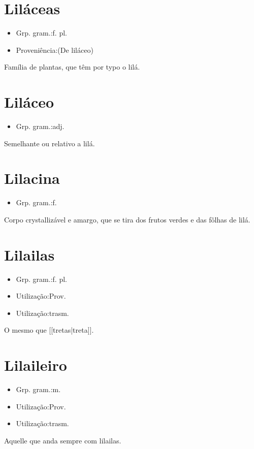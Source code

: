 \section{Liláceas}
\begin{itemize}
\item {Grp. gram.:f. pl.}
\end{itemize}
\begin{itemize}
\item {Proveniência:(De \textunderscore liláceo\textunderscore )}
\end{itemize}
Família de plantas, que têm por typo o lilá.
\section{Liláceo}
\begin{itemize}
\item {Grp. gram.:adj.}
\end{itemize}
Semelhante ou relativo a lilá.
\section{Lilacina}
\begin{itemize}
\item {Grp. gram.:f.}
\end{itemize}
Corpo crystallizável e amargo, que se tira dos frutos verdes e das fôlhas de lilá.
\section{Lilailas}
\begin{itemize}
\item {Grp. gram.:f. pl.}
\end{itemize}
\begin{itemize}
\item {Utilização:Prov.}
\end{itemize}
\begin{itemize}
\item {Utilização:trasm.}
\end{itemize}
O mesmo que [[tretas|treta]].
\section{Lilaileiro}
\begin{itemize}
\item {Grp. gram.:m.}
\end{itemize}
\begin{itemize}
\item {Utilização:Prov.}
\end{itemize}
\begin{itemize}
\item {Utilização:trasm.}
\end{itemize}
Aquelle que anda sempre com lilailas.
